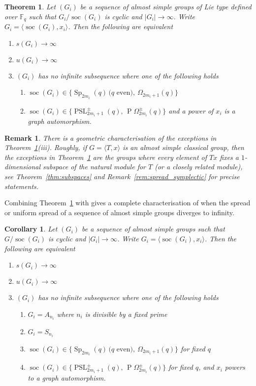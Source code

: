 \documentclass[11pt]{article}
\numberwithin{equation}{section}
\theoremstyle{shdefinition}
\newtheorem{shremark}[shdefinition]{Remark}
\theoremstyle{shplain}
\newtheorem{shtheorem}[shdefinition]{Theorem}
\newtheorem{shcorollary}[shdefinition]{Corollary}
\newcommand{\<}{\langle}
\renewcommand{\>}{\rangle}
\newcommand{\soc}{\operatorname{soc}}
\newcommand{\F}{\mathbb{F}}
\renewcommand{\:}{\colon}
\newcommand{\PSL}{\operatorname{PSL}}
\newcommand{\Sp}{\operatorname{Sp}}
\newcommand{\Om}{\Omega}
\newcommand{\POm}{\operatorname{P}\!\Om}
\begin{document}
\begin{shtheorem}\label{thm:spread}
Let $(G_i)$ be a sequence of almost simple groups of Lie type defined over $\F_q$ such that $G_i/\soc(G_i)$ is cyclic and $|G_i| \to \infty$. Write $G_i = \<\soc(G_i),x_i\>$. Then the following are equivalent
\begin{enumerate}
\item $s(G_i) \to \infty$
\item $u(G_i) \to \infty$
\item $(G_i)$ has no infinite subsequence where one of the following holds
\begin{enumerate}[{\rm (a)}]
\item $\soc(G_i) \in \{ \Sp_{2m_i}(q) \, \text{($q$ even)}, \ \Om_{2m_i+1}(q) \}$ 
\item $\soc(G_i) \in \{ \PSL^\pm_{2m_i+1}(q),\, \POm^\pm_{2m_i}(q) \}$ and a power of $x_i$ is a graph automorphism.
\end{enumerate}
\end{enumerate}
\end{shtheorem} 

\begin{shremark}\label{rem:spread}
There is a geometric characterisation of the exceptions in Theorem~\ref{thm:spread}(iii). Roughly, if $G = \< T, x \>$ is an almost simple classical group, then the exceptions in Theorem~\ref{thm:spread} are the groups where every element of $Tx$ fixes a $1$-dimensional subspace of the natural module for $T$ (or a closely related module), see Theorem~\ref{thm:subspaces} and Remark~\ref{rem:spread_symplectic} for precise statements.
\end{shremark}

Combining Theorem~\ref{thm:spread} with \cite[Corollary~9]{ref:BurnessGuralnickHarper} gives a complete characterisation of when the spread or uniform spread of a sequence of almost simple groups diverges to infinity.

\begin{shcorollary}\label{cor:spread}
Let $(G_i)$ be a sequence of almost simple groups such that $G/{\soc(G_i)}$ is cyclic and $|G_i| \to \infty$. Write $G_i = \<\soc(G_i),x_i\>$. Then the following are equivalent
\begin{enumerate}
\item $s(G_i) \to \infty$
\item $u(G_i) \to \infty$
\item $(G_i)$ has no infinite subsequence where one of the following holds
\begin{enumerate}[{\rm (a)}]
\item $G_i = A_{n_i}$ where $n_i$ is divisible by a fixed prime
\item $G_i = S_{n_i}$
\item $\soc(G_i) \in \{ \Sp_{2m_i}(q) \, \text{($q$ even)}, \ \Om_{2m_i+1}(q) \}$ for fixed $q$
\item $\soc(G_i) \in \{ \PSL^\pm_{2m_i+1}(q),\, \POm^\pm_{2m_i}(q) \}$ for fixed $q$, and $x_i$ powers to a graph automorphism.
\end{enumerate}
\end{enumerate}
\end{shcorollary} 
\end{document}
